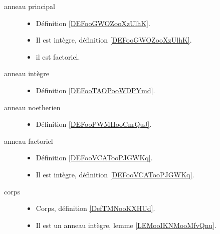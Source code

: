 \begin{description}
	\item[anneau principal]\hspace{1cm}
	\begin{itemize}
		\item
		      Définition \ref{DEFooGWOZooXzUlhK}.
		\item
		      Il est intègre, définition \ref{DEFooGWOZooXzUlhK}.
		\item
		      il est factoriel\cite{BIBooENJGooWhQisg}.		%
	\end{itemize}
	\item[anneau intègre]\hspace{1cm}
	\begin{itemize}
		\item
		      Définition \ref{DEFooTAOPooWDPYmd}.
	\end{itemize}
	\item[anneau noetherien]\hspace{1cm}
	\begin{itemize}
		\item
		      Définition \ref{DEFooPWMHooCnrQuJ}.
	\end{itemize}
	\item[anneau factoriel]\hspace{1cm}
	\begin{itemize}
		\item
		      Définition \ref{DEFooVCATooPJGWKq}.
		\item
		      Il est intègre, définition \ref{DEFooVCATooPJGWKq}.
	\end{itemize}
	\item[corps]\hspace{1cm}
	\begin{itemize}
		\item
		      Corps, définition \ref{DefTMNooKXHUd}.
		\item
		      Il est un anneau intègre, lemme \ref{LEMooIKNMooMfvQnu}.
	\end{itemize}
\end{description}

